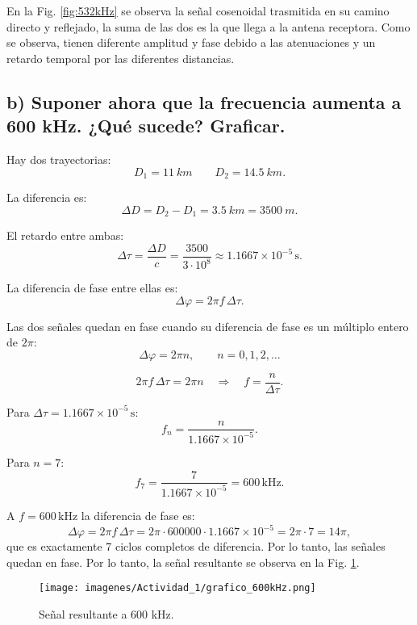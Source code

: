 En la Fig. \ref{fig:532kHz} se observa la señal cosenoidal trasmitida en su camino directo y reflejado, la suma de las dos es la que 
llega a la antena receptora. Como se observa, tienen diferente amplitud y fase debido a las atenuaciones y un retardo temporal por las 
diferentes distancias.
\bigskip

\subsection*{b) Suponer ahora que la frecuencia aumenta a 600 kHz. ¿Qué sucede? Graficar. }

Hay dos trayectorias:
    \[
         D_1 = \SI{11}{km} \qquad D_2 = \SI{14.5}{km}.  
    \]
\bigskip

La diferencia es:
    \[
        \Delta D = D_2 - D_1 = \SI{3.5}{km} = \SI{3500}{m}.
    \]
\bigskip

El retardo entre ambas:
    \[
        \Delta \tau = \frac{\Delta D}{c} = 
        \frac{3500}{3 \cdot 10^{8}}
        \approx 1.1667 \times 10^{-5}\,\text{s}.
    \]

\bigskip

La diferencia de fase entre ellas es:
    \[
        \Delta\varphi = 2\pi f \,\Delta\tau.
    \]


Las dos señales quedan en fase cuando su diferencia de fase es un múltiplo entero de \(2\pi\):
    \[
        \Delta\varphi = 2\pi n,\qquad n=0,1,2,\dots
    \]


    \[
        2\pi f \,\Delta\tau = 2\pi n \quad\Longrightarrow\quad f=\frac{n}{\Delta\tau}.
    \]
\bigskip

Para \(\Delta\tau=1.1667\times10^{-5}\,\text{s}\):
    \[
        f_n=\frac{n}{1.1667\times10^{-5}}.
    \]
\bigskip

Para \(n=7\):
    \[
        f_7=\frac{7}{1.1667\times10^{-5}}=600\,\text{kHz}.
    \]
\bigskip

A \(f=600\,\text{kHz}\) la diferencia de fase es:
    \[
        \Delta\varphi=2\pi f \,\Delta\tau=2\pi\cdot 600000\cdot1.1667\times10^{-5}
        =2\pi\cdot 7=14\pi,
    \]
que es exactamente 7 ciclos completos de diferencia. Por lo tanto, las señales quedan en fase. Por lo tanto, la señal resultante se 
observa en la Fig. \ref{fig:600kHz}.

    \begin{figure}[H]
        \centering
        \texttt{[image: imagenes/Actividad\_1/grafico\_600kHz.png]}
        \caption{Señal resultante a 600 kHz.}
        \label{fig:600kHz}
    \end{figure}


